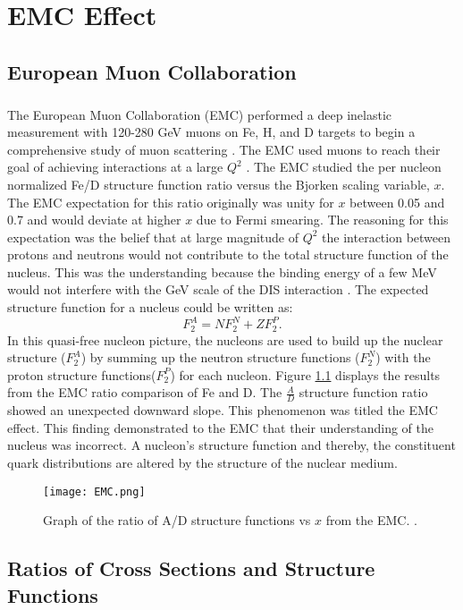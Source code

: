 \chapter{EMC Effect}	
\section{European Muon Collaboration}\label{sec:EMC}
\paragraph{}The European Muon Collaboration (EMC) performed a deep inelastic measurement with 120-280 GeV muons on Fe, H, and D targets to begin a comprehensive study of muon scattering \cite{challenge, Norton}. The EMC used muons to reach their goal of achieving interactions at a large $Q^2$ \cite{seelyth}. The EMC studied the per nucleon normalized Fe/D structure function ratio versus the Bjorken scaling variable, $x$. The EMC expectation for this ratio originally was unity for $x$ between 0.05 and 0.7 and would deviate at higher $x$ due to Fermi smearing\cite{CC}. The reasoning for this expectation was the belief that at large magnitude of $Q^2$ the interaction between protons and neutrons would not contribute to the total structure function of the nucleus. This was the understanding because the binding energy of a few MeV would not interfere with the GeV scale of the DIS interaction \cite{Ajth}. The expected structure function for a nucleus could be written as:
\begin{equation}
F_2^A = N F_2^N + ZF_2^P.
\end{equation}
In this quasi-free nucleon picture, the nucleons are used to build up the nuclear structure ($F_2^A$) by summing up the neutron structure functions ($F_2^N$) with the proton structure functions($F_2^P$) for each nucleon. Figure \ref{EMCOld} displays the results from the EMC ratio comparison of Fe and D. The $\frac{A}{D}$ structure function ratio showed an unexpected downward slope. This phenomenon was titled the EMC effect. This finding demonstrated to the EMC that their understanding of the nucleus was incorrect. A nucleon's structure function and thereby, the constituent quark distributions are altered by the structure of the nuclear medium. 
\begin{figure}[t]
	\centering
	\texttt{[image: EMC.png]} 
	\caption{ Graph of the ratio of A/D structure functions vs $x$ from the EMC. \cite{CC,EM}.}
	\label{EMCOld}
\end{figure} 
\section{Ratios of Cross Sections and Structure Functions}
